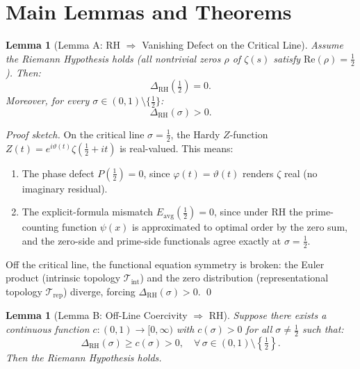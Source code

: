 \documentclass[11pt]{article}
\newtheorem{lemma}[theorem]{Lemma}
\theoremstyle{remark}
\begin{document}
\section{Main Lemmas and Theorems}
\label{sec:lemmas}


\begin{lemma}[Lemma A: RH $\Rightarrow$ Vanishing Defect on the Critical Line]
\label{lem:rh-A}
Assume the Riemann Hypothesis holds (all nontrivial zeros $\rho$ of $\zeta(s)$ satisfy $\mathrm{Re}(\rho) = \tfrac{1}{2}$). Then:
\[
  \Delta_{\mathrm{RH}}\!\left(\tfrac{1}{2}\right) = 0.
\]
Moreover, for every $\sigma \in (0,1) \setminus \{\tfrac{1}{2}\}$:
\[
  \Delta_{\mathrm{RH}}(\sigma) > 0.
\]
\end{lemma}

\begin{proof}[Proof sketch]
On the critical line $\sigma = \tfrac{1}{2}$, the Hardy $Z$-function $Z(t) = e^{i\vartheta(t)} \zeta(\tfrac{1}{2} + it)$ is real-valued. This means:
\begin{enumerate}
  \item The phase defect $P(\tfrac{1}{2}) = 0$, since $\varphi(t) = \vartheta(t)$ renders $\zeta$ real (no imaginary residual).
  \item The explicit-formula mismatch $E_{\mathrm{avg}}(\tfrac{1}{2}) = 0$, since under RH the prime-counting function $\psi(x)$ is approximated to optimal order by the zero sum, and the zero-side and prime-side functionals agree exactly at $\sigma = \tfrac{1}{2}$.
\end{enumerate}
Off the critical line, the functional equation symmetry is broken: the Euler product (intrinsic topology $\mathcal{T}_{\mathrm{int}}$) and the zero distribution (representational topology $\mathcal{T}_{\mathrm{rep}}$) diverge, forcing $\Delta_{\mathrm{RH}}(\sigma) > 0$. \qed
\end{proof}


\begin{lemma}[Lemma B: Off-Line Coercivity $\Rightarrow$ RH]
\label{lem:rh-B}
Suppose there exists a continuous function $c: (0,1) \to [0,\infty)$ with $c(\sigma) > 0$ for all $\sigma \neq \tfrac{1}{2}$ such that:
\[
  \Delta_{\mathrm{RH}}(\sigma) \geq c(\sigma) > 0, \quad \forall\, \sigma \in (0,1) \setminus \left\{\tfrac{1}{2}\right\}.
\]
Then the Riemann Hypothesis holds.
\end{lemma}
\end{document}
